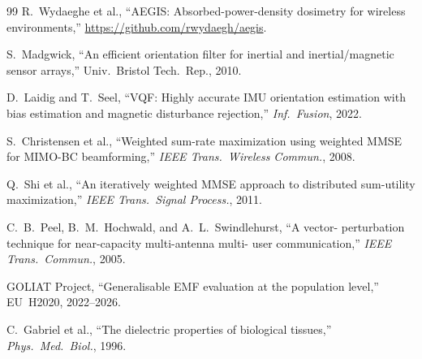 \documentclass[journal,twocolumn,10pt]{IEEEtran}
\theoremstyle{definition}
\begin{document}
\begin{thebibliography}{99}
R.~Wydaeghe et al., ``AEGIS: Absorbed-power-density dosimetry for
wireless environments,'' \url{https://github.com/rwydaegh/aegis}.

S.~Madgwick, ``An efficient orientation filter for inertial and
inertial/magnetic sensor arrays,'' Univ.\ Bristol Tech.\ Rep.,
2010.

D.~Laidig and T.~Seel, ``VQF: Highly accurate IMU orientation
estimation with bias estimation and magnetic disturbance
rejection,'' \emph{Inf.\ Fusion}, 2022.

S.~Christensen et al., ``Weighted sum-rate maximization using
weighted MMSE for MIMO-BC beamforming,'' \emph{IEEE Trans.\
Wireless Commun.}, 2008.

Q.~Shi et al., ``An iteratively weighted MMSE approach to
distributed sum-utility maximization,'' \emph{IEEE Trans.\
Signal Process.}, 2011.

C.~B.~Peel, B.~M.~Hochwald, and A.~L.~Swindlehurst, ``A vector-
perturbation technique for near-capacity multi-antenna multi-
user communication,'' \emph{IEEE Trans.\ Commun.}, 2005.

GOLIAT Project, ``Generalisable EMF evaluation at the population
level,'' EU~H2020, 2022--2026.

C.~Gabriel et al., ``The dielectric properties of biological
tissues,'' \emph{Phys.\ Med.\ Biol.}, 1996.

\end{thebibliography}
\end{document}
